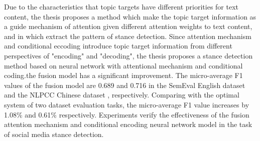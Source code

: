 {%

Due to the characteristics that topic targets have different priorities for text content, the thesis proposes a method which make the topic target information as a guide mechanism of attention given different attention weights to text content, and in which extract the pattern of stance detection. Since attention mechanism and conditional eccoding introduce topic target information from different perspectives of "encoding" and "decoding", the thesis proposes a stance detection method based on neural network with attentional mechanism and conditional coding.the fusion model has a significant improvement. The micro-average F1 values of the fusion model are 0.689 and 0.716 in the SemEval English dataset and the NLPCC Chinese dataset , respectively. Comparing with the optimal system of two dataset evaluation tasks, the micro-average F1 value increases by 1.08\% and 0.61\% respectively. Experiments verify the effectiveness of the fusion attention mechanism and conditional encoding neural network model in the task of social media stance detection.

}


\makecover
\clearpage 
